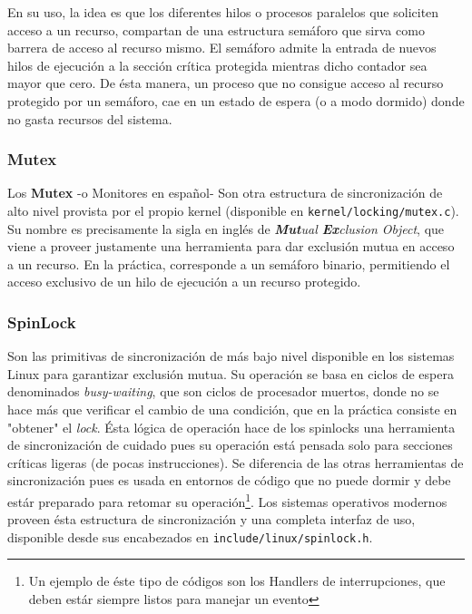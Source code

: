 En su uso, la idea es que los diferentes hilos o procesos paralelos que soliciten acceso a un recurso, compartan de una estructura semáforo que sirva como barrera de acceso al recurso mismo. El semáforo admite la entrada de nuevos hilos de ejecución a la sección crítica protegida mientras dicho contador sea mayor que cero. De ésta manera, un proceso que no consigue acceso al recurso protegido por un semáforo, cae en un estado de espera (o a modo dormido) donde no gasta recursos del sistema.

\subsubsection{Mutex}
Los \textbf{Mutex} -o Monitores en español- Son otra estructura de sincronización de alto nivel provista por el propio kernel (disponible en \verb=kernel/locking/mutex.c=). Su nombre es precisamente la sigla en inglés de \emph{\textbf{Mut}ual \textbf{Ex}clusion Object}, que viene a proveer justamente una herramienta para dar exclusión mutua en acceso a un recurso. En la práctica, corresponde a un semáforo binario, permitiendo el acceso exclusivo de un hilo de ejecución a un recurso protegido.

\subsubsection{SpinLock}
Son las primitivas de sincronización de más bajo nivel disponible en los sistemas Linux para garantizar exclusión mutua. Su operación se basa en ciclos de espera denominados \emph{busy-waiting}, que son ciclos de procesador muertos, donde no se hace más que verificar el cambio de una condición, que en la práctica consiste en "obtener" el \emph{lock}. Ésta lógica de operación hace de los spinlocks una herramienta de sincronización de cuidado pues su operación está pensada solo para secciones críticas ligeras (de pocas instrucciones). Se diferencia de las otras herramientas de sincronización pues es usada en entornos de código que no puede dormir y debe estár preparado para retomar su operación\footnote{Un ejemplo de éste tipo de códigos son los Handlers de interrupciones, que deben estár siempre listos para manejar un evento}. Los sistemas operativos modernos proveen ésta estructura de sincronización y una completa interfaz de uso, disponible desde sus encabezados en \verb=include/linux/spinlock.h=.

